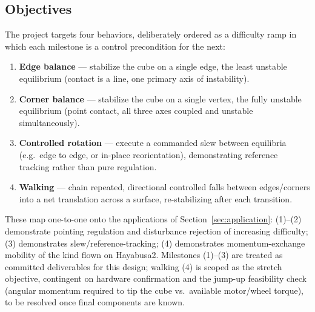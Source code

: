 \subsection{Objectives}
\label{sec:objectives}

The project targets four behaviors, deliberately ordered as a difficulty ramp in which each milestone is a control precondition for the next:

\begin{enumerate}
    \item \textbf{Edge balance} — stabilize the cube on a single edge, the least unstable equilibrium (contact is a line, one primary axis of instability).
    \item \textbf{Corner balance} — stabilize the cube on a single vertex, the fully unstable equilibrium (point contact, all three axes coupled and unstable simultaneously).
    \item \textbf{Controlled rotation} — execute a commanded slew between equilibria (e.g.\ edge to edge, or in-place reorientation), demonstrating reference tracking rather than pure regulation.
    \item \textbf{Walking} — chain repeated, directional controlled falls between edges/corners into a net translation across a surface, re-stabilizing after each transition.
\end{enumerate}

These map one-to-one onto the applications of Section~\ref{sec:application}: (1)–(2) demonstrate pointing regulation and disturbance rejection of increasing difficulty; (3) demonstrates slew/reference-tracking; (4) demonstrates momentum-exchange mobility of the kind flown on Hayabusa2. Milestones (1)–(3) are treated as committed deliverables for this design; walking (4) is scoped as the stretch objective, contingent on hardware confirmation and the jump-up feasibility check (angular momentum required to tip the cube vs.\ available motor/wheel torque), to be resolved once final components are known.
